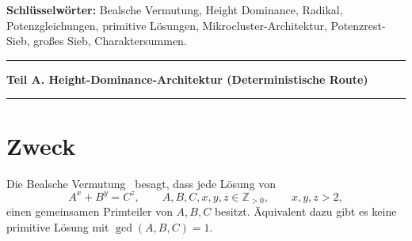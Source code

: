 \documentclass[11pt,a4paper]{article}
\begin{document}
\begin{abstract}
\emph{Teil B (asymptotischer Sieb-Begleiter).}
Für positive primitive Lösungen mit festem $K\ge4$ und $3\le x,y,z\le K$,
ohne $(3,3,3)$, ergibt die korrigierte positive Zeilenrekonstruktion auf
klassischen Jacobi-/Weil- und Großsieb-Eingaben
$T_K(H)\ll_{K,\varepsilon}H^{2/3}/\Sigma(Q;K)$ für hinreichend große $H$
und $(\log H)^{2+\varepsilon}\le Q\le H^{1/(2K)}$.
Der untere Cut ist hinreichend, nicht notwendig. Die ganzzahlige Nullzeile
wird ausgeschlossen; Nullrestzeilen, leere Klassen und ein verschwindendes
Ausschlussbudget werden ausdrücklich behandelt. Keine explizite Schwelle
$H_0(K,\varepsilon)$ und kein effektives Konstantenpaket sind hier zertifiziert.
Das formale HD2'-Entropiebudget folgt asymptotisch aus Dichten für feste
Exponenten und Primzahlen in festen arithmetischen Progressionen; es ist
von den Basen unabhängig und beweist keine Wurzelkohärenz.
Die exponentielle Schranke der kumulativen positiven Lösungszählung würde
unter diesen Entropie-Eingaben $T_K\equiv0$ erzwingen; für alle festen $K$
ist sie bereits Beal-stark und keine schwache Zwischenschranke.

Version 1.1 berichtigt Genus- und Regime-Klassifikation, Nullzeilenrichtung
und Siebdomänen, skalare Monodromie und starke Charaktersummen sowie die
Reichweite des klassischen $(3,4,5)$-Resultats. Die elementare Ungleichung
$\Xi\ge\log4$ liefert keine IUT-/gcd-Brücke; historische Diagnosescores und
fest gesetzte Gates liefern keinen Beal-Ausschluss. Numerische Tabellen
bleiben historische Diagnostik. HD3', getypte Transfers, explizite Konstanten,
unabhängige Methodenvalidierung und vollständige Quellen-/Beweisprüfung bleiben offen.
\end{abstract}

\noindent\textbf{Schlüsselwörter:} Bealsche Vermutung, Height Dominance, Radikal, Potenzgleichungen, primitive Lösungen, Mikrocluster-Architektur, Potenzrest-Sieb, großes Sieb, Charaktersummen.

\clearpage
\tableofcontents
\clearpage

\bigskip
\hrule
\medskip
\begin{center}
\textbf{Teil A. Height-Dominance-Architektur (Deterministische Route)}
\end{center}
\medskip
\hrule
\bigskip

\section{Zweck}

Die Bealsche Vermutung~\cite{Mauldin1997} besagt, dass jede Lösung von
\[
  A^x + B^y = C^z,
  \qquad A,B,C,x,y,z \in \mathbb Z_{>0},
  \qquad x,y,z>2,
\]
einen gemeinsamen Primteiler von $A,B,C$ besitzt. Äquivalent dazu gibt es keine primitive Lösung mit $\gcd(A,B,C)=1$.
\end{document}
